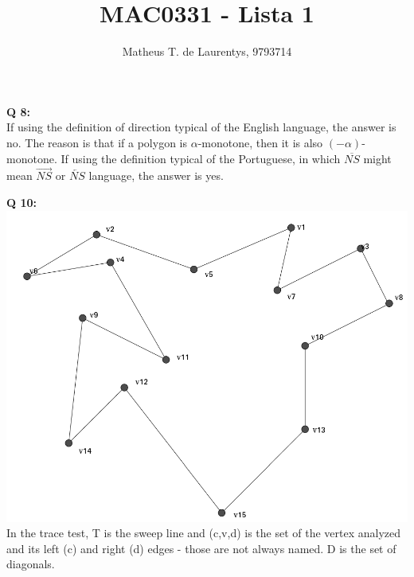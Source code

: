\documentclass[]{article}
\title{\vspace{-4.0cm}MAC0331 - Lista 1}
\author{Matheus T. de Laurentys, 9793714}
\begin{document}
	\maketitle
	\noindent
	\textbf{Q 8:} \\
	If using the definition of direction typical of the English language, the answer is no. The reason is that if a polygon is \mbox{$\alpha$-monotone}, then it is also \mbox{$(-\alpha)$-monotone}. If using the definition typical of the Portuguese, in which $\overline{NS}$ might mean $\overrightarrow{NS}$ or $\overleftarrow{NS}$ language, the answer is yes. 
	
	\textbf{Q 10:} \\
	\includegraphics[scale=0.4]{l4_im.png} \\
	In the trace test, T is the sweep line and (c,v,d) is the set of the vertex analyzed and its left (c) and right (d) edges - those are not always named. D is the set of diagonals.
\end{document}
